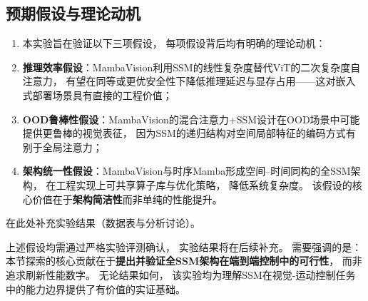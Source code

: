 \subsection{预期假设与理论动机}

\begin{enumerate}
\item 本实验旨在验证以下三项假设，
每项假设背后均有明确的理论动机：
\item \textbf{推理效率假设}：MambaVision利用SSM的线性复杂度替代ViT的二次复杂度自注意力，
有望在同等或更优安全性下降低推理延迟与显存占用——这对嵌入式部署场景具有直接的工程价值；
 \item \textbf{OOD鲁棒性假设}：MambaVision的混合注意力+SSM设计在OOD场景中可能提供更鲁棒的视觉表征，
因为SSM的递归结构对空间局部特征的编码方式有别于全局注意力；
 \item \textbf{架构统一性假设}：MambaVision与时序Mamba形成空间--时间同构的全SSM架构，
在工程实现上可共享算子库与优化策略，
降低系统复杂度。
该假设的核心价值在于\textbf{架构简洁性}而非单纯的性能提升。
 \end{enumerate}

在此处补充实验结果（数据表与分析讨论）。

上述假设均需通过严格实验评测确认，
实验结果将在后续补充。
需要强调的是：本节探索的核心贡献在于\textbf{提出并验证全SSM架构在端到端控制中的可行性}，
而非追求刷新性能数字。
无论结果如何，
该实验均为理解SSM在视觉-运动控制任务中的能力边界提供了有价值的实证基础。
